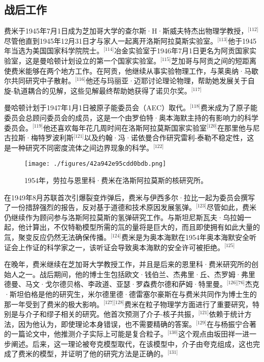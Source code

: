 \subsection{战后工作}
费米于1945年7月1日成为芝加哥大学的查尔斯·H·斯威夫特杰出物理学教授，\(^\text{[112]}\)尽管他直到1945年12月31日才与家人一起离开洛斯阿拉莫斯实验室。\(^\text{[113]}\)他于1945年当选为美国国家科学院院士。\(^\text{[114]}\)冶金实验室于1946年7月1日更名为阿贡国家实验室，这是曼哈顿计划设立的第一个国家实验室。\(^\text{[115]}\)芝加哥与阿贡之间的短距离使费米能够在两个地方工作。在阿贡，他继续从事实验物理工作，与莱奥纳·马歇尔共同研究中子散射。\(^\text{[116]}\)他还与玛丽亚·迈耶讨论理论物理，帮助她发展关于自旋-轨道耦合的见解，这些见解最终帮助她获得了诺贝尔奖。\(^\text{[117]}\)

曼哈顿计划于1947年1月1日被原子能委员会（AEC）取代。\(^\text{[118]}\)费米成为了原子能委员会总顾问委员会的成员，这是一个由罗伯特·奥本海默主持的有影响力的科学委员会。\(^\text{[119]}\)他还喜欢每年花几周时间在洛斯阿拉莫斯国家实验室\(^\text{[120]}\)在那里他与尼古拉斯·梅特罗波利斯\(^\text{[121]}\)以及约翰·冯·诺依曼合作研究雷利-泰勒不稳定性，这是一种研究不同密度流体之间边界现象的科学。\(^\text{[122]}\)
\begin{figure}[ht]
\centering
\texttt{[image: ./figures/42a942e95cdd0bdb.png]}
\caption{1954年，劳拉与恩里科·费米在洛斯阿拉莫斯的核研究所。} \label{fig_ELK_12}
\end{figure}
在1949年8月苏联首次引爆裂变炸弹后，费米与伊西多尔·拉比一起为委员会撰写了一份措辞强烈的报告，反对基于道德和技术原因发展氢弹。\(^\text{[123]}\)尽管如此，费米仍继续作为顾问参与洛斯阿拉莫斯的氢弹研究工作。与斯坦尼斯瓦夫·乌拉姆一起，他计算出，不仅特勒模型所需的氚的量将是巨大的，而且即使拥有如此大量的氚，聚变反应仍然无法确保传播。\(^\text{[124]}\)费米是为奥本海默在1954年奥本海默安全听证会上作证的科学家之一，该听证会导致奥本海默的安全许可被拒绝。\(^\text{[125]}\)

在晚年，费米继续在芝加哥大学教授工作，并且是后来的恩里科·费米研究所的创始人之一。战后期间，他的博士生包括欧文·钱伯兰、杰弗里·丘、杰罗姆·弗里德曼、马文·戈尔德贝格、李政道、亚瑟·罗森费尔德和萨姆·特里曼。\(^\text{[126][76]}\)杰克·斯坦伯格是他的研究生，米尔德里德·德雷塞尔豪斯在与费米共同作为博士生的那一年受到了费米的极大影响。\(^\text{[127][128]}\)费米在粒子物理学方面进行了重要研究，特别是与介子和缪子相关的研究。他首次预测了介子-核子共振，\(^\text{[121]}\)依赖于统计方法，因为他认为，即使理论本身错误，也不需要精确的答案。\(^\text{[129]}\)在与杨振宁合著的一篇论文中，他推测介子实际上可能是复合粒子。\(^\text{[130]}\)这个观点由坂田祥一进一步阐述。后来，这一理论被夸克模型取代，在该模型中，介子由夸克组成，这也完成了费米的模型，并证明了他的研究方法是正确的。\(^\text{[131]}\)

